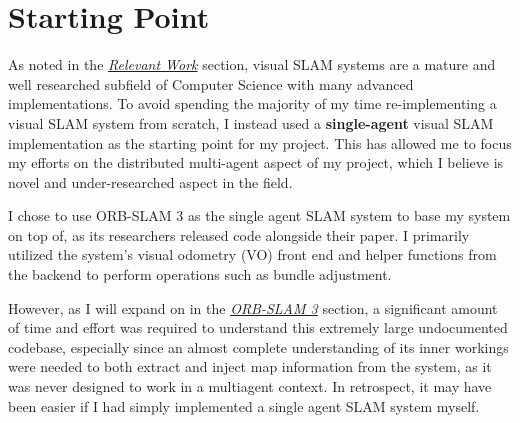 




\label{sec:2}

\section{Starting Point}
\label{sec:2.1}
As noted in the \hyperref[sec:relevant-work]{\textit{Relevant Work}} section, visual SLAM systems are a mature and well researched subfield of Computer Science with many advanced implementations. To avoid spending the majority of my time re-implementing a visual SLAM system from scratch, I instead used a \textbf{single-agent} visual SLAM implementation as the starting point for my project. This has allowed me to focus my efforts on the distributed multi-agent aspect of my project, which I believe is novel and under-researched aspect in the field.

I chose to use ORB-SLAM 3 as the single agent SLAM system to base my system on top of, as its researchers released code alongside their paper. I primarily utilized the system's visual odometry (VO) front end and helper functions from the backend to perform operations such as bundle adjustment.

However, as I will expand on in the \hyperref[sec:orb-slam-3]{\textit{ORB-SLAM 3}} section, a significant amount of time and effort was required to understand this extremely large undocumented codebase, especially since an almost complete understanding of its inner workings were needed to both extract and inject map information from the system, as it was never designed to work in a multiagent context. In retrospect, it may have been easier if I had simply implemented a single agent SLAM system myself.

